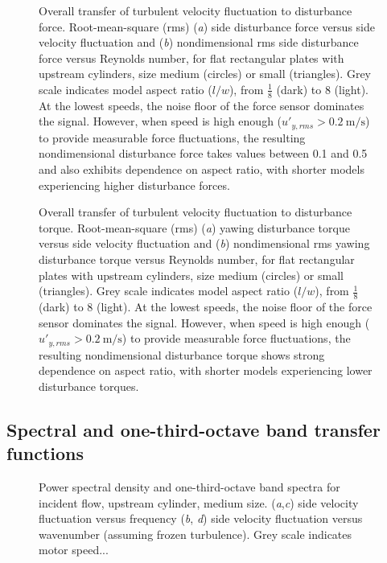 \begin{figure} 
\caption{Overall transfer of turbulent velocity fluctuation to disturbance force.  Root-mean-square (rms) (\textit{a}) side disturbance force versus side velocity fluctuation and (\textit{b}) nondimensional rms side disturbance force versus Reynolds number, for flat rectangular plates with upstream cylinders, size medium (circles) or small (triangles).  Grey scale indicates model aspect ratio ($l/w$), from $\frac{1}{8}$ (dark) to \num{8} (light).  At the lowest speeds, the noise floor of the force sensor dominates the signal.  However, when speed is high enough ($u'_{y,rms}>\SI{0.2}{\meter\per\second}$) to provide measurable force fluctuations, the resulting nondimensional disturbance force takes values between \num{0.1} and \num{0.5} and also exhibits dependence on aspect ratio, with shorter models experiencing higher disturbance forces. }
\label{fig:overallfluctuations}
\end{figure}

\begin{figure} 
\caption{Overall transfer of turbulent velocity fluctuation to disturbance torque.  Root-mean-square (rms) (\textit{a}) yawing disturbance torque versus side velocity fluctuation and (\textit{b}) nondimensional rms yawing disturbance torque versus Reynolds number, for flat rectangular plates with upstream cylinders, size medium (circles) or small (triangles).  Grey scale indicates model aspect ratio ($l/w$), from $\frac{1}{8}$ (dark) to \num{8} (light).  At the lowest speeds, the noise floor of the force sensor dominates the signal.  However, when speed is high enough ($u'_{y,rms}>\SI{0.2}{\meter\per\second}$) to provide measurable force fluctuations, the resulting nondimensional disturbance torque shows strong dependence on aspect ratio, with shorter models experiencing lower disturbance torques. }
\label{fig:overallfluctuations}
\end{figure}

\subsection{Spectral and one-third-octave band transfer functions}

\begin{figure} 
\caption{Power spectral density and one-third-octave band spectra for incident flow, upstream cylinder, medium size. (\textit{a},\textit{c}) side velocity fluctuation versus frequency (\textit{b}, \textit{d}) side velocity fluctuation versus wavenumber (assuming frozen turbulence).  Grey scale indicates motor speed... }
\label{fig:exampleflowspectra}
\end{figure}

